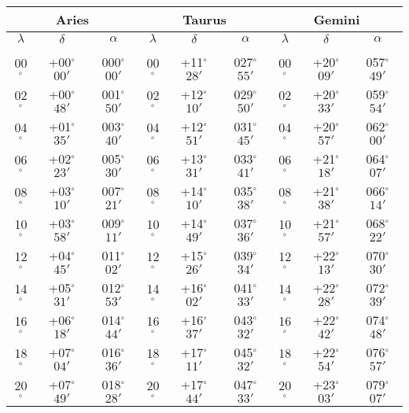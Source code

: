 \newpage
\begin{table}
\centering
\begin{tabular}{ccc|ccc|ccc}
\multicolumn{3}{c}{Aries}\vline & \multicolumn{3}{c}{Taurus} \vline& \multicolumn{3}{c}{Gemini}\\\hline
$\lambda$& $\delta$& $\alpha$& $\lambda$& $\delta$& $\alpha$& $\lambda$& $\delta$& $\alpha$\\\hline
&&&&&&&&\\[-2ex]
00$^\circ$ & +00$^\circ$$00'$ & 000$^\circ$$00'$ & 00$^\circ$ & +11$^\circ$$28'$ & 027$^\circ$$55'$ & 00$^\circ$ & +20$^\circ$$09'$ & 057$^\circ$$49'$\\
02$^\circ$ & +00$^\circ$$48'$ & 001$^\circ$$50'$ & 02$^\circ$ & +12$^\circ$$10'$ & 029$^\circ$$50'$ & 02$^\circ$ & +20$^\circ$$33'$ & 059$^\circ$$54'$\\
04$^\circ$ & +01$^\circ$$35'$ & 003$^\circ$$40'$ & 04$^\circ$ & +12$^\circ$$51'$ & 031$^\circ$$45'$ & 04$^\circ$ & +20$^\circ$$57'$ & 062$^\circ$$00'$\\
06$^\circ$ & +02$^\circ$$23'$ & 005$^\circ$$30'$ & 06$^\circ$ & +13$^\circ$$31'$ & 033$^\circ$$41'$ & 06$^\circ$ & +21$^\circ$$18'$ & 064$^\circ$$07'$\\
08$^\circ$ & +03$^\circ$$10'$ & 007$^\circ$$21'$ & 08$^\circ$ & +14$^\circ$$10'$ & 035$^\circ$$38'$ & 08$^\circ$ & +21$^\circ$$38'$ & 066$^\circ$$14'$\\
10$^\circ$ & +03$^\circ$$58'$ & 009$^\circ$$11'$ & 10$^\circ$ & +14$^\circ$$49'$ & 037$^\circ$$36'$ & 10$^\circ$ & +21$^\circ$$57'$ & 068$^\circ$$22'$\\
12$^\circ$ & +04$^\circ$$45'$ & 011$^\circ$$02'$ & 12$^\circ$ & +15$^\circ$$26'$ & 039$^\circ$$34'$ & 12$^\circ$ & +22$^\circ$$13'$ & 070$^\circ$$30'$\\
14$^\circ$ & +05$^\circ$$31'$ & 012$^\circ$$53'$ & 14$^\circ$ & +16$^\circ$$02'$ & 041$^\circ$$33'$ & 14$^\circ$ & +22$^\circ$$28'$ & 072$^\circ$$39'$\\
16$^\circ$ & +06$^\circ$$18'$ & 014$^\circ$$44'$ & 16$^\circ$ & +16$^\circ$$37'$ & 043$^\circ$$32'$ & 16$^\circ$ & +22$^\circ$$42'$ & 074$^\circ$$48'$\\
18$^\circ$ & +07$^\circ$$04'$ & 016$^\circ$$36'$ & 18$^\circ$ & +17$^\circ$$11'$ & 045$^\circ$$32'$ & 18$^\circ$ & +22$^\circ$$54'$ & 076$^\circ$$57'$\\
20$^\circ$ & +07$^\circ$$49'$ & 018$^\circ$$28'$ & 20$^\circ$ & +17$^\circ$$44'$ & 047$^\circ$$33'$ & 20$^\circ$ & +23$^\circ$$03'$ & 079$^\circ$$07'$\\

\end{tabular}
\end{table}
